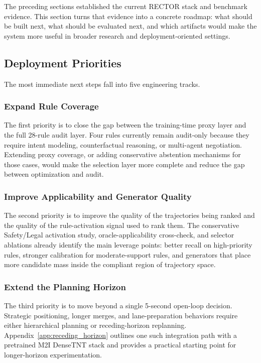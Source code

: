 The preceding sections established the current RECTOR stack and benchmark evidence.  This section turns that evidence into a concrete roadmap: what should be built next, what should be evaluated next, and which artifacts would make the system more useful in broader research and deployment-oriented settings.

\subsection{Deployment Priorities}
\label{subsec:limitations}

The most immediate next steps fall into five engineering tracks.

\subsubsection{Expand Rule Coverage}
The first priority is to close the gap between the training-time proxy layer and the full 28-rule audit layer.  Four rules currently remain audit-only because they require intent modeling, counterfactual reasoning, or multi-agent negotiation.  Extending proxy coverage, or adding conservative abstention mechanisms for those cases, would make the selection layer more complete and reduce the gap between optimization and audit.

\subsubsection{Improve Applicability and Generator Quality}
The second priority is to improve the quality of the trajectories being ranked and the quality of the rule-activation signal used to rank them.  The conservative Safety/Legal activation study, oracle-applicability cross-check, and selector ablations already identify the main leverage points: better recall on high-priority rules, stronger calibration for moderate-support rules, and generators that place more candidate mass inside the compliant region of trajectory space.

\subsubsection{Extend the Planning Horizon}
The third priority is to move beyond a single 5-second open-loop decision.  Strategic positioning, longer merges, and lane-preparation behaviors require either hierarchical planning or receding-horizon replanning.  Appendix~\ref{app:receding_horizon} outlines one such integration path with a pretrained M2I DenseTNT stack and provides a practical starting point for longer-horizon experimentation.


